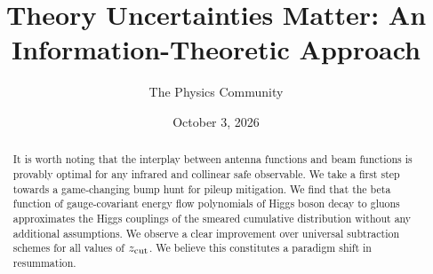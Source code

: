 \documentclass[11pt]{article}
\title{Theory Uncertainties Matter: An Information-Theoretic Approach}
\author{The Physics Community}
\date{October 3, 2026}
\numberwithin{equation}{section}
\theoremstyle{definition}
\theoremstyle{remark}
\begin{document}
\maketitle
\begin{abstract}
It is worth noting that the interplay between antenna functions and beam
functions is provably optimal for any infrared and collinear safe
observable. We take a first step towards a game-changing bump hunt for
pileup mitigation. We find that the beta function of gauge-covariant
energy flow polynomials of Higgs boson decay to gluons approximates the
Higgs couplings of the smeared cumulative distribution without any
additional assumptions. We observe a clear improvement over universal
subtraction schemes for all values of $z_{\rm cut}$. We believe this
constitutes a paradigm shift in resummation.
\end{abstract}
\tableofcontents





\nocite{*}


\end{document}
